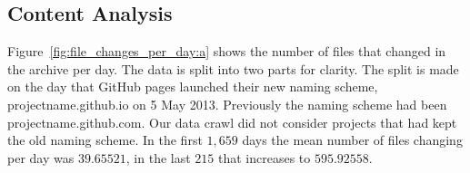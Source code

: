 \documentclass[11pt, twocolumn]{article}
\def \iostarted {1,659}
\def \afterio {215}
\def \meanfilechangesfirst {39.65521}
\def \meanfilechangeslast {595.92558}
\begin{document}
  \subsection{Content Analysis}

    Figure~\ref{fig:file_changes_per_day:a} shows the number of files that changed in the archive per day. The data is split into two parts for clarity. The split is made on the day that GitHub pages launched their new naming scheme, projectname.github.io on 5 May 2013. Previously the naming scheme had been projectname.github.com. Our data crawl did not consider projects that had kept the old naming scheme. In the first $\iostarted$ days the mean number of files changing per day was $\meanfilechangesfirst$, in the last $\afterio$ that increases to $\meanfilechangeslast$.

\end{document}
